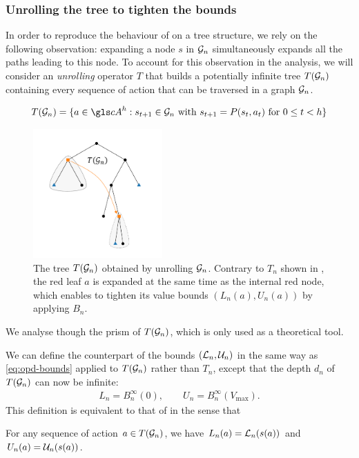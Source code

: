 \subsubsection{Unrolling the tree to tighten the bounds}
\label{sec:unrolling}

In order to reproduce the behaviour of  on a tree structure, we rely on the following observation:  expanding a node $s$ in $\mathcal{G}_n$ simultaneously expands all the paths leading to this node.
To account for this observation in the analysis, we will consider an \emph{unrolling} operator $T$ that builds a potentially infinite tree $T(\mathcal{G}_n)$ containing every sequence of action that can be traversed in a graph $\mathcal{G}_n$.

\begin{equation}
T(\cG_n) = \{a\in \cA^h: s_{t+1} \in \cG_n \text{ with } s_{t+1} = P(s_{t}, a_t)\text{ for } 0 \leq t < h\}
\end{equation}

\begin{figure}[htp]
	\centering
	\includegraphics[trim={2.cm 1cm 2.5cm 1cm}, clip, width=0.44\textwidth]{img/gbop/tree_5.pdf}
	\caption{The tree $T(\mathcal{G}_n)$ obtained by unrolling $\mathcal{G}_n$. Contrary to $T_n$ shown in , the red leaf $a$ is expanded at the same time as the internal red node, which enables to tighten its value bounds $(L_n(a), U_n(a))$ by applying $B_n$.}
	\label{fig:unroll}
\end{figure}
We analyse \GBOPD though the prism of $T(\mathcal{G}_n)$, which is only used as a theoretical tool. 

We can define the counterpart of the bounds $(\mathcal{L}_n, \mathcal{U}_n)$ in the same way as \eqref{eq:opd-bounds} applied to $T(\mathcal{G}_n)$ rather than $T_n$, except that the depth $d_n$ of $T(\mathcal{G}_n)$ can now be infinite:
\begin{align}
\label{eq:gbop-t-bounds}
L_n = B_n^{\infty}(0), \qquad U_n = B_n^{\infty}(V_{\max}).
\end{align}
This definition is equivalent to that of \GBOPD in the sense that
\begin{lemma}
	\label{lem:equivalence}
	For any sequence of action $a\in T(\mathcal{G}_n)$, we have $L_n(a) = \mathcal{L}_n(s(a))$ and $U_n(a) = \mathcal{U}_n(s(a))$.	
\end{lemma}


